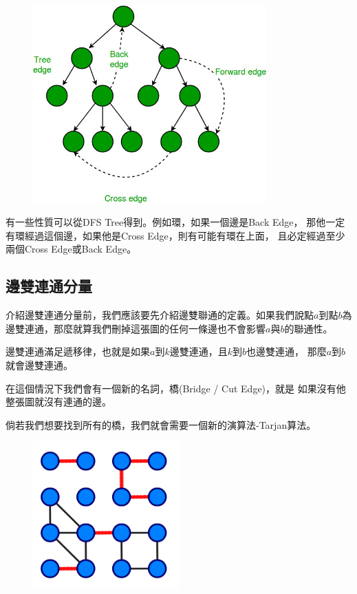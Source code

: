     \begin{figure}[!htbp]
        \centering
        \includegraphics[width=0.8\textwidth]{../Images/AT2.png}
    \end{figure}

    有一些性質可以從DFS Tree得到。例如環，如果一個邊是Back Edge，
    那他一定有環經過這個邊，如果他是Cross Edge，則有可能有環在上面，
    且必定經過至少兩個Cross Edge或Back Edge。

    \subsection{邊雙連通分量}
    介紹邊雙連通分量前，我們應該要先介紹邊雙聯通的定義。如果我們說點$a$到點$b$為
    邊雙連通，那麼就算我們刪掉這張圖的任何一條邊也不會影響$a$與$b$的聯通性。

    邊雙連通滿足遞移律，也就是如果$a$到$k$邊雙連通，且$k$到$b$也邊雙連通，
    那麼$a$到$b$就會邊雙連通。

    在這個情況下我們會有一個新的名詞，橋(Bridge / Cut Edge)，就是
    如果沒有他整張圖就沒有連通的邊。

    倘若我們想要找到所有的橋，我們就會需要一個新的演算法-Tarjan算法。
    
    \begin{figure}[!htbp]
        \centering
        \includegraphics[width=0.5\textwidth]{../Images/AT3.png}
    \end{figure}

